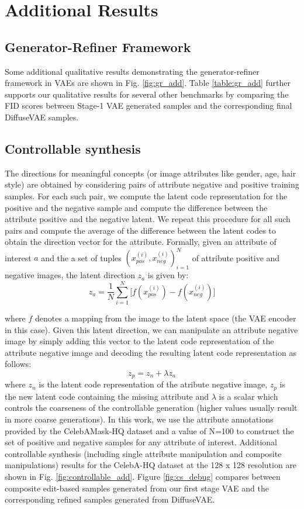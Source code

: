 \documentclass[10pt]{article} \usepackage[accepted]{tmlr}
\begin{document}
\newpage
\section{Additional Results}
\label{app:appendix_f}
\subsection{Generator-Refiner Framework}
Some additional qualitative results demonstrating the generator-refiner framework in VAEs are shown in Fig. \ref{fig:gr_add}. Table \ref{table:gr_add} further supports our qualitative results for several other benchmarks by comparing the FID scores between Stage-1 VAE generated samples and the corresponding final DiffuseVAE samples.

\subsection{Controllable synthesis}
\label{sec:app_controllable}
The directions for meaningful concepts (or image attributes like gender, age, hair style) are obtained by considering pairs of attribute negative and positive training samples. For each such pair, we compute the latent code representation for the positive and the negative sample and compute the difference between the attribute positive and the negative latent. We repeat this procedure for all such pairs and compute the average of the difference between the latent codes to obtain the direction vector for the attribute. Formally, given an attribute of interest $a$ and the a set of tuples $(x_{pos}^{(i)}, x_{neg}^{(i)})_{i=1}^N$ of attribute positive and negative images, the latent direction $z_a$ is given by:
\begin{equation}
    z_a = \frac{1}{N}\sum_{i=1}^N \Bigg[f(x_{pos}^{(i)}) - f(x_{neg}^{(i)})\Bigg]
\end{equation}

where $f$ denotes a mapping from the image to the latent space (the VAE encoder in this case). Given this latent direction, we can manipulate an attribute negative image by simply adding this vector to the latent code representation of the attribute negative image and decoding the resulting latent code representation as follows:
\begin{equation}
    z_p = z_n + \lambda z_a
\end{equation}
where $z_n$ is the latent code representation of the atribute negative image, $z_p$ is the new latent code containing the missing attribute and $\lambda$ is a scalar which controls the coarseness of the controllable generation (higher values usually result in more coarse generations).
In this work, we use the attribute annotations provided by the CelebAMask-HQ dataset \citep{CelebAMask-HQ} and a value of N=100 to construct the set of positive and negative samples for any attribute of interest. Additional controllable synthesis (including single attribute manipulation and composite manipulations) results for the CelebA-HQ dataset at the 128 x 128 resolution are shown in Fig. \ref{fig:controllable_add}. Figure \ref{fig:cs_debug} compares between composite edit-based samples generated from our first stage VAE and the corresponding refined samples generated from DiffuseVAE.
\end{document}
